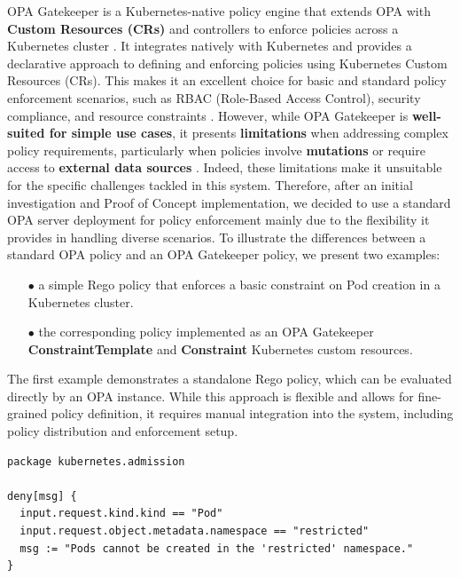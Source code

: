 OPA Gatekeeper is a Kubernetes-native policy engine that extends OPA with \textbf{Custom Resources (CRs)} and controllers to enforce policies across a Kubernetes cluster \cite{opa_gatekeeper}. 
It integrates natively with Kubernetes and provides a declarative approach to defining and enforcing policies using Kubernetes Custom Resources (CRs). 
This makes it an excellent choice for basic and standard policy enforcement scenarios, such as RBAC (Role-Based Access Control), security compliance, and resource constraints \cite{opa_gatekeeper}.
However, while OPA Gatekeeper is \textbf{well-suited for simple use cases}, it presents \textbf{limitations} when addressing complex policy requirements, particularly when policies involve \textbf{mutations} or require access to \textbf{external data sources} \cite{opa_gatekeeper_external_data}. 
Indeed, these limitations make it unsuitable for the specific challenges tackled in this system. 
Therefore, after an initial investigation and Proof of Concept implementation, we decided to use a standard OPA server deployment for policy enforcement mainly due to the flexibility it provides in handling diverse scenarios.
To illustrate the differences between a standard OPA policy and an OPA Gatekeeper policy, we present two examples:  
\begin{itemize}[itemsep=0.2pt, topsep=1pt]
  \item[$\bullet$] a simple Rego policy that enforces a basic constraint on Pod creation in a Kubernetes cluster.
  \item[$\bullet$] the corresponding policy implemented as an OPA Gatekeeper \textbf{ConstraintTemplate} and \textbf{Constraint} Kubernetes custom resources.
\end{itemize}

The first example demonstrates a standalone Rego policy, which can be evaluated directly by an OPA instance. 
While this approach is flexible and allows for fine-grained policy definition, it requires manual integration into the system, including policy distribution and enforcement setup.  

\begin{lstlisting}[language=rego, caption={Simple OPA Rego Policy}, label={lst:opa-rego}]
package kubernetes.admission

deny[msg] {
  input.request.kind.kind == "Pod"
  input.request.object.metadata.namespace == "restricted"
  msg := "Pods cannot be created in the 'restricted' namespace."
}
\end{lstlisting}

